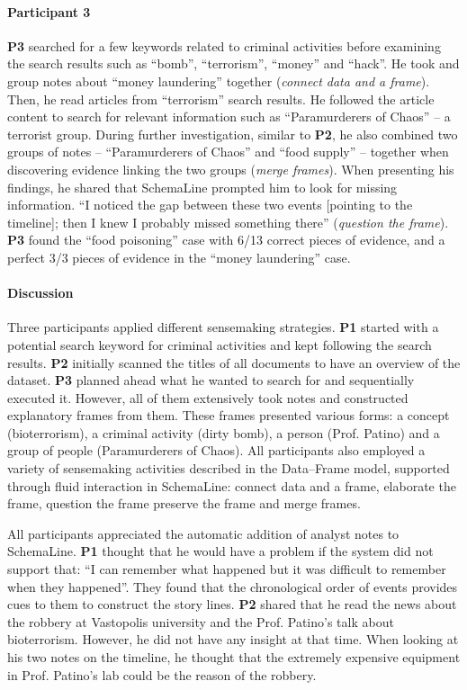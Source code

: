 \paragraph{Participant 3}
\textbf{P3} searched for a few keywords related to criminal activities before examining the search results such as ``bomb'', ``terrorism'', ``money'' and ``hack''. He took and group notes about ``money laundering'' together (\emph{connect data and a frame}). Then, he read articles from ``terrorism'' search results. He followed the article content to search for relevant information such as ``Paramurderers of Chaos'' -- a terrorist group. During further investigation, similar to \textbf{P2}, he also combined two groups of notes -- ``Paramurderers of Chaos'' and ``food supply'' -- together when discovering evidence linking the two groups (\emph{merge frames}). When presenting his findings, he shared that SchemaLine prompted him to look for missing information. ``I noticed the gap between these two events [pointing to the timeline]; then I knew I probably missed something there'' (\emph{question the frame}). \textbf{P3} found the ``food poisoning'' case with 6/13 correct pieces of evidence, and a perfect 3/3 pieces of evidence in the ``money laundering'' case. 

\paragraph{Discussion}
Three participants applied different sensemaking strategies. \textbf{P1} started with a potential search keyword for criminal activities and kept following the search results. \textbf{P2} initially scanned the titles of all documents to have an overview of the dataset. \textbf{P3} planned ahead what he wanted to search for and sequentially executed it. However, all of them extensively took notes and constructed explanatory frames from them. These frames presented various forms: a concept (bioterrorism), a criminal activity (dirty bomb), a person (Prof. Patino) and a group of people (Paramurderers of Chaos). All participants also employed a variety of sensemaking activities described in the Data--Frame model, supported through fluid interaction in SchemaLine: connect data and a frame, elaborate the frame, question the frame preserve the frame and merge frames.

All participants appreciated the automatic addition of analyst notes to SchemaLine. \textbf{P1} thought that he would have a problem if the system did not support that: ``I can remember what happened but it was difficult to remember when they happened''. They found that the chronological order of events provides cues to them to construct the story lines. \textbf{P2} shared that he read the news about the robbery at Vastopolis university and the Prof. Patino's talk about bioterrorism. However, he did not have any insight at that time. When looking at his two notes on the timeline, he thought that the extremely expensive equipment in Prof. Patino's lab could be the reason of the robbery. 

